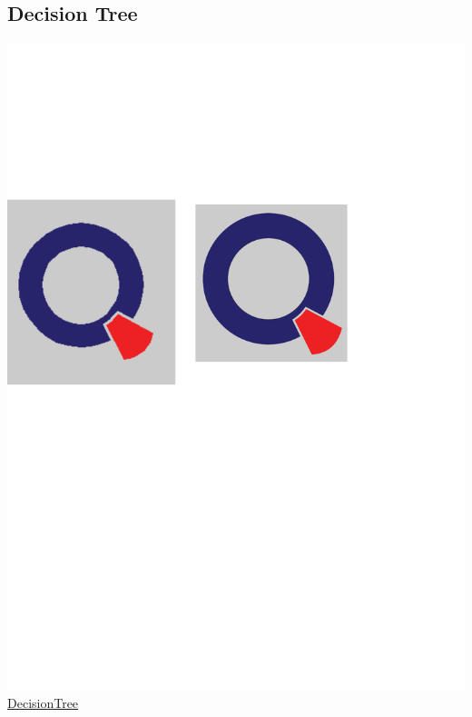 \documentclass[12pt, a4paper, bibliography=totoc, english]{scrartcl}
\begin{document}
\subsection{Decision Tree}
\includegraphics[scale=0.08]{qletlogo}
\textcolor{blue}{\href{https://github.com/JingyiLiu3136/MLFBM/blob/master/decisiontree/SPL_decisiontree.r}{DecisionTree}}
\end{document}
